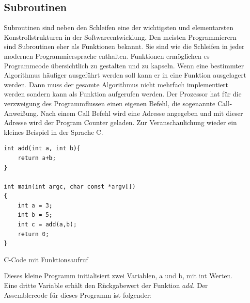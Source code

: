 \documentclass[12pt]{article}
\begin{document}
\subsection{Subroutinen}
Subroutinen sind neben den Schleifen eine der wichtigsten und elementarsten Konstrollstrukturen in der Softwareentwicklung. Den meisten Programmierern sind Subroutinen eher als Funktionen bekannt. Sie sind wie die Schleifen in jeder modernen Programmiersprache enthalten. Funktionen ermöglichen es Programmcode übersichtlich zu gestalten und zu kapseln. Wenn eine bestimmter Algorithmus häufiger ausgeführt werden soll kann er in eine Funktion ausgelagert werden. Dann muss der gesamte Algorithmus nicht mehrfach implementiert werden sondern kann als Funktion aufgerufen werden. Der Prozessor hat für die verzweigung des Programmflussen einen eigenen Befehl, die sogenannte Call-Anweißung. Nach einem Call Befehl wird eine Adresse angegeben und mit dieser Adresse wird der Program Counter geladen. Zur Veranschaulichung wieder ein kleines Beispiel in der Sprache C.  

\begin{code}[!htb]
\begin{lstlisting}
int add(int a, int b){
	return a+b;
}

int main(int argc, char const *argv[])
{
	int a = 3;
	int b = 5;
	int c = add(a,b); 
	return 0;
}
\end{lstlisting}
\caption[C Code Funktionen]{C-Code mit Funktionsaufruf}
\end{code}

Dieses kleine Programm initialisiert zwei Variablen, a und b, mit int Werten. Eine dritte Variable erhält den Rückgabewert der Funktion $add$. Der Assemblercode für dieses Programm ist folgender: 
 
\end{document}
